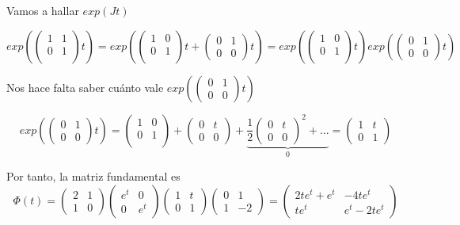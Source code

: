 \begin{example}
Vamos a hallar $exp(Jt)$
\begin{center}
$exp(\begin{pmatrix}
1 & 1\\0 & 1\\
\end{pmatrix}t) = exp(\begin{pmatrix}
1 & 0\\ 0 & 1\\
\end{pmatrix}t+\begin{pmatrix}
0 & 1\\ 0 & 0
\end{pmatrix}t) = exp(\begin{pmatrix}
1 & 0\\ 0 & 1\\
\end{pmatrix}t)exp(\begin{pmatrix}
0 & 1\\ 0 & 0
\end{pmatrix}t)$
\end{center}

Nos hace falta saber cuánto vale $exp(\begin{pmatrix}
0 & 1\\ 0 & 0
\end{pmatrix}t)$

$$exp(\begin{pmatrix}
0 & 1\\ 0 & 0
\end{pmatrix}t) = \begin{pmatrix}
1 & 0 \\ 0 & 1\\
\end{pmatrix} + \begin{pmatrix}
0 & t \\ 0 & 0 
\end{pmatrix} + \underbrace{\frac{1}{2}\begin{pmatrix}
0 & t \\ 0 & 0
\end{pmatrix}^2 + \hdots}_0 = \begin{pmatrix}
1 & t\\ 0 & 1
\end{pmatrix}$$

Por tanto, la matriz fundamental es
$$\Phi(t) = \begin{pmatrix}
2 & 1\\1  & 0
\end{pmatrix}\begin{pmatrix}
e^t & 0\\ 0 & e^t
\end{pmatrix}\begin{pmatrix}
1 & t\\ 0 & 1
\end{pmatrix}\begin{pmatrix}
0 & 1\\1 & -2
\end{pmatrix} = \begin{pmatrix}
2te^t+e^t & -4te^t\\te^t& e^t-2te^t
\end{pmatrix}$$
\end{example}

